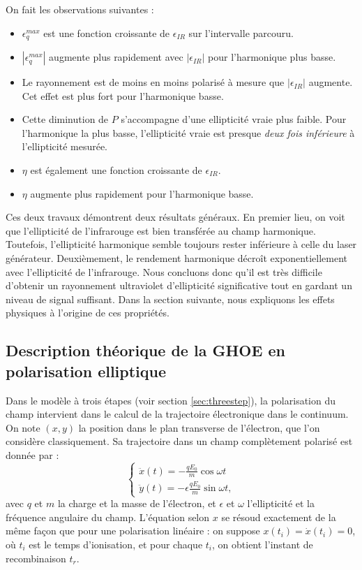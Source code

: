 On fait les observations suivantes :
\begin{itemize}
\renewcommand{\labelitemi}{$\bullet$}
\setlength\itemsep{1em}
\item $\epsilon^{max}_q$ est une fonction croissante de $\epsilon_{IR}$ sur l'intervalle parcouru.
\item $|\epsilon^{max}_q|$ augmente plus rapidement avec $|\epsilon_{IR}|$ pour l'harmonique plus basse.
\item Le rayonnement est de moins en moins polarisé à mesure que $|\epsilon_{IR}|$ augmente. Cet effet est plus fort pour l'harmonique basse.
\item Cette diminution de $P$ s'accompagne d'une ellipticité vraie plus faible. Pour l'harmonique la plus basse, l'ellipticité vraie est presque \textit{deux fois inférieure} à l'ellipticité mesurée.
\item $\eta$ est également une fonction croissante de $\epsilon_{IR}$.
\item $\eta$ augmente plus rapidement pour l'harmonique basse.
\end{itemize}
\vspace{\baselineskip}
Ces deux travaux démontrent deux résultats généraux. En premier lieu, on voit que l'ellipticité de l'infrarouge est bien transférée au champ harmonique. Toutefois, l'ellipticité harmonique semble toujours rester inférieure à celle du laser générateur. Deuxièmement, le rendement harmonique décroît exponentiellement avec l'ellipticité de l'infrarouge. Nous concluons donc qu'il est très difficile d'obtenir un rayonnement ultraviolet d'ellipticité significative tout en gardant un niveau de signal suffisant. Dans la section suivante, nous expliquons les effets physiques à l'origine de ces propriétés.

\subsection{Description théorique de la GHOE en polarisation elliptique}
Dans le modèle à trois étapes (voir section \ref{sec:threestep}), la polarisation du champ intervient dans le calcul de la trajectoire électronique dans le continuum. On note $(x,y)$ la position dans le plan transverse de l'électron, que l'on considère classiquement. Sa trajectoire dans un champ complètement polarisé est donnée par :
\[\left\{
\begin{array}{l}
  \ddot{x}(t) = -\frac{qE_0}{m}\cos\omega t \\
  \ddot{y}(t) = -\epsilon\frac{qE_0}{m}\sin\omega t,
\end{array}
\right.\]
avec $q$ et $m$ la charge et la masse de l'électron, et $\epsilon$ et $\omega$ l'ellipticité et la fréquence angulaire du champ. L'équation selon $x$ se résoud exactement de la même façon que pour une polarisation linéaire : on suppose $x(t_i) = \dot{x}(t_i) = 0$, où $t_i$ est le temps d'ionisation, et pour chaque $t_i$, on obtient l'instant de recombinaison $t_r$.

